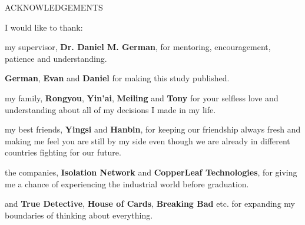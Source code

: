\newpage
{}

\begin{center}
ACKNOWLEDGEMENTS
\end{center}

\noindent 
I would like to thank:

my supervisor, {\bf Dr. Daniel M. German}, for mentoring, encouragement, patience and understanding. 

{\bf German}, {\bf Evan} and {\bf Daniel} for making this study published.

my family, {\bf Rongyou}, {\bf Yin'ai}, {\bf Meiling} and {\bf Tony} for your selfless love and understanding about all of my decisions I made in my life.

my best friends, {\bf Yingsi} and {\bf Hanbin}, for keeping our friendship always fresh and making me feel you are still by my side even though we are already in different countries fighting for our future. 

the companies, {\bf Isolation Network} and {\bf CopperLeaf Technologies}, for giving me a chance of experiencing the industrial world before graduation. 

and {\bf True Detective}, {\bf House of Cards}, {\bf Breaking Bad} etc. for expanding my boundaries of thinking about everything. 